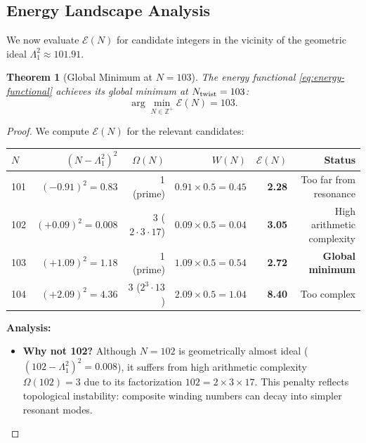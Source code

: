 \documentclass[12pt, a4paper]{article}
\newtheorem{theorem}{Theorem}[section]
\theoremstyle{definition}
\newcommand{\bbZ}{\mathbb{Z}}
\begin{document}
\subsection{Energy Landscape Analysis}

We now evaluate $\mathcal{E}(N)$ for candidate integers in the vicinity of the geometric ideal $\Lambda_1^2 \approx 101.91$.

\begin{theorem}[Global Minimum at $N = 103$]
The energy functional \eqref{eq:energy-functional} achieves its global minimum at $N_{\rm twist} = 103$:
\begin{equation}
\arg\min_{N \in \bbZ^+} \mathcal{E}(N) = 103.
\end{equation}
\end{theorem}

\begin{proof}
We compute $\mathcal{E}(N)$ for the relevant candidates:

\begin{center}
\label{tab:energy-landscape}
\begin{tabular}{@{}l r r r r r@{}}
\toprule
\textbf{$N$} & \textbf{$(N - \Lambda_1^2)^2$} & \textbf{$\Omega(N)$} & \textbf{$W(N)$} & \textbf{$\mathcal{E}(N)$} & \textbf{Status} \\
\midrule
101 & $(-0.91)^2 = 0.83$ & 1 (prime) & $0.91 \times 0.5 = 0.45$ & \textbf{2.28} & Too far from resonance \\
102 & $(+0.09)^2 = 0.008$ & 3 ($2 \cdot 3 \cdot 17$) & $0.09 \times 0.5 = 0.04$ & \textbf{3.05} & High arithmetic complexity \\
103 & $(+1.09)^2 = 1.18$ & 1 (prime) & $1.09 \times 0.5 = 0.54$ & \textbf{2.72} & \textbf{Global minimum} \\
104 & $(+2.09)^2 = 4.36$ & 3 ($2^3 \cdot 13$) & $2.09 \times 0.5 = 1.04$ & \textbf{8.40} & Too complex \\
\bottomrule
\end{tabular}
\end{center}

\noindent\textbf{Analysis:}
\begin{itemize}
    \item \textbf{Why not 102?} Although $N = 102$ is geometrically almost ideal ($(102 - \Lambda_1^2)^2 = 0.008$), it suffers from high arithmetic complexity $\Omega(102) = 3$ due to its factorization $102 = 2 \times 3 \times 17$. This penalty reflects topological instability: composite winding numbers can decay into simpler resonant modes.
    

\end{itemize}
\end{proof}
\end{document}
